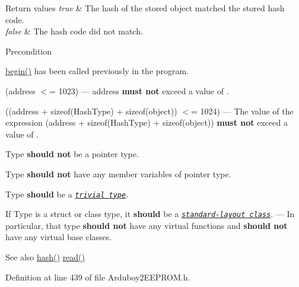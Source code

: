 \begin{DoxyRetVals}{Return values}
{\em true} & The hash of the stored object matched the stored hash code. \\
\hline
{\em false} & The hash code did not match.\\
\hline
\end{DoxyRetVals}
\begin{DoxyPrecond}{Precondition}
\begin{DoxyItemize}
\item {\ttfamily \mbox{\hyperlink{classArduboy2EEPROM_a4d482ef8e8204c56a0feba68791bc0c8}{begin()}}} has been called previously in the program. \item {\ttfamily (address $<$= 1023)} --- {\ttfamily address} {\bfseries{must not}} exceed a value of {}. \item {\ttfamily ((address + sizeof(\+Hash\+Type) + sizeof(object)) $<$= 1024)} --- The value of the expression {\ttfamily (address + sizeof(\+Hash\+Type) + sizeof(object))} {\bfseries{must not}} exceed a value of {}. \item {\ttfamily Type} {\bfseries{should not}} be a pointer type. \item {\ttfamily Type} {\bfseries{should not}} have any member variables of pointer type. \item {\ttfamily Type} {\bfseries{should}} be a \href{https://en.cppreference.com/w/cpp/named_req/TrivialType}{\texttt{ {\itshape trivial type}}}. \item If {\ttfamily Type} is a {\ttfamily struct} or {\ttfamily class} type, it {\bfseries{should}} be a \href{https://en.cppreference.com/w/cpp/language/classes\#Standard-layout_class}{\texttt{ {\itshape standard-\/layout class}}}. --- In particular, that type {\bfseries{should not}} have any {\ttfamily virtual} functions and {\bfseries{should not}} have any {\ttfamily virtual} base classes.\end{DoxyItemize}

\end{DoxyPrecond}
\begin{DoxySeeAlso}{See also}
\mbox{\hyperlink{classArduboy2EEPROM_a03bad380b02c4aa613f5a84b7e2712b6}{hash()}} \mbox{\hyperlink{classArduboy2EEPROM_a6e9b09f0b94295c040204ca0cb674649}{read()}} 
\end{DoxySeeAlso}


Definition at line 439 of file Arduboy2\+E\+E\+P\+R\+O\+M.\+h.

\mbox{\label{classArduboy2EEPROM_a6b0ef10b0c2f082b2c55a6e002802512}} 
